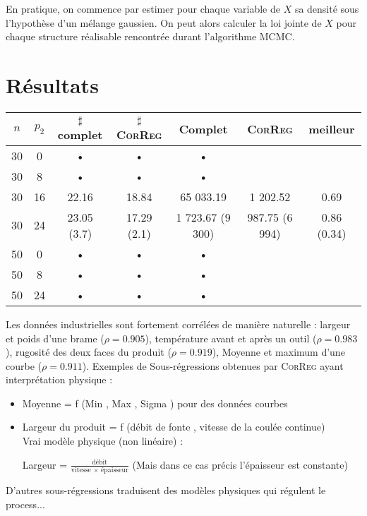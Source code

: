 \documentclass[12pt]{article}
\begin{document}
	En pratique, on commence par estimer pour chaque variable de $X$ sa densité sous l'hypothèse d'un mélange gaussien. On peut alors calculer la loi jointe de $X$ pour chaque structure réalisable rencontrée durant l'algorithme MCMC.
\section{Résultats}	






\begin{tabular}{|c|c|c|c|c|c|c|}
\hline 
$n$ & $p_2$ & $\sharp$ complet & $\sharp$ \textsc{CorReg} &Complet & \textsc{CorReg} & meilleur \\ 
\hline  
30 & 0 & • & • & • &&\\
\hline 
30 & 8 & • & • & • &&\\ 
\hline 
30 & 16 & 22.16 & 18.84 & 65 033.19 & 1 202.52 & 0.69\\ 
\hline 
30 & 24 & 23.05 (3.7) & 17.29 (2.1) & 1 723.67 (9 300) & 987.75 (6 994)& 0.86 (0.34)\\ 
\hline 
50 & 0 & • & • & •&& \\ 
\hline 
50 & 8 & • & • & • &&\\ 
\hline 
50 & 24 & • & • & • && \\ 
\hline 
\end{tabular} 


Les données industrielles sont fortement corrélées de manière naturelle : largeur et poids d'une brame ($\rho=0.905$), température avant et après un outil ($\rho=0.983$), rugosité des deux faces du produit ($\rho=0.919$), Moyenne et maximum d'une courbe ($\rho=0.911$).
Exemples de Sous-régressions obtenues par \textsc{CorReg} ayant interprétation physique :
\begin{itemize}
	\item Moyenne = f (Min , Max , Sigma ) pour des données courbes
	\item Largeur du produit = f (débit de fonte , vitesse de la coulée continue)	\\
Vrai modèle physique (non linéaire) :

	 Largeur = $\frac{\textrm{débit}}{\textrm{vitesse } \times \textrm{ épaisseur}}$ (Mais dans ce cas précis l'épaisseur est constante)
			\end{itemize}
			
			D'autres sous-régressions traduisent des modèles physiques qui régulent le process...
\\
\end{document}
